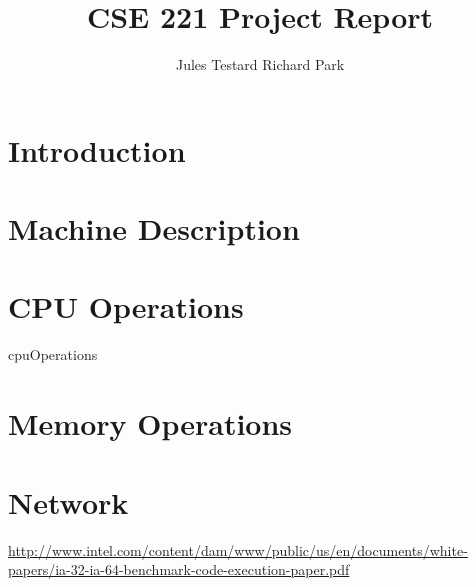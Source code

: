 \documentclass[11pt,twocolumn]{article}
\begin{document}
\title{CSE 221 Project Report}
\author{Jules Testard \quad Richard Park}
\maketitle

\section{Introduction}



\section{Machine Description}



\section{CPU Operations}

 {cpuOperations}

\section{Memory Operations}



\section{Network}



\begin{thebibliography}{9}
    \url{http://www.intel.com/content/dam/www/public/us/en/documents/white-papers/ia-32-ia-64-benchmark-code-execution-paper.pdf}
\end{thebibliography}
\end{document}

